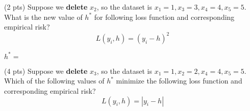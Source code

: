 \documentclass[twoside,12pt]{article}
\begin{document}
\begin{probset}
\begin{prob}
\begin{subprobset}
\begin{subprob}
        \begin{center}
        \end{center}
        \begin{responsebox}{0.75in}
            
        \end{responsebox}
    \end{subprob}

    \begin{subprob}(2 pts)
        Suppose we \textbf{delete} $x_2$, so the dataset is $x_1 = 1, x_3=3, x_4=4, x_5=5$. What is the new value of $h^*$ for following loss function and corresponding empirical risk?
        $$L(y_i, h) = (y_i - h)^2$$

        \begin{center}
            $h^* = $ \inlineresponsebox[3in]{}
        \end{center}
    \end{subprob}

    
    \begin{subprob}(4 pts)
        Suppose we \textbf{delete} $x_3$, so the dataset is $x_1 = 1, x_2=2, x_4=4, x_5=5$. Which of the following values of $h^*$ minimize the following loss function and corresponding empirical risk? 
        $$L(y_i, h) = |y_i - h|$$
        
    \end{subprob}
\end{subprobset}
\end{prob}


\end{probset}
\end{document}
